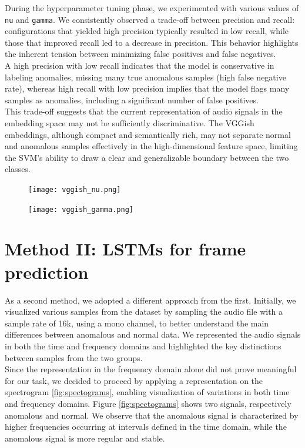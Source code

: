 \documentclass[ngerman]{scrartcl}
\begin{document}
During the hyperparameter tuning phase, we experimented with various values of \texttt{nu} and \texttt{gamma}. We consistently observed a trade-off between precision and recall: configurations that yielded high precision typically resulted in low recall, while those that improved recall led to a decrease in precision. This behavior highlights the inherent tension between minimizing false positives and false negatives.\\ 
A high precision with low recall indicates that the model is conservative in labeling anomalies, missing many true anomalous samples (high false negative rate), whereas high recall with low precision implies that the model flags many samples as anomalies, including a significant number of false positives.\\
This trade-off suggests that the current representation of audio signals in the embedding space may not be sufficiently discriminative. The VGGish embeddings, although compact and semantically rich, may not separate normal and anomalous samples effectively in the high-dimensional feature space, limiting the SVM's ability to draw a clear and generalizable boundary between the two classes.


\begin{figure}[htbp]
    \centering
    \begin{minipage}{0.48\textwidth}
        \centering
        \texttt{[image: vggish\_nu.png]}
        \label{fig:image1}
    \end{minipage}
    \hfill
    \begin{minipage}{0.48\textwidth}
        \centering
        \texttt{[image: vggish\_gamma.png]}
        \label{fig:image2}
    \end{minipage}
    \label{fig:side_by_side}
\end{figure}

\section{Method II: LSTMs for frame prediction}

As a second method, we adopted a different approach from the first. 
Initially, we visualized various samples from the dataset by sampling the audio file with a sample rate of 16k, using a mono channel, to better understand the main differences between anomalous and normal data. 
We represented the audio signals in both the time and frequency domains and highlighted the key distinctions between samples from the two groups.
\\Since the representation in the frequency domain alone did not prove meaningful for our task, we decided to proceed by applying a representation on the spectrogram \ref{fig:spectograms},
 enabling visualization of variations in both time and frequency domains. Figure \ref{fig:spectograms} shows two signals, respectively anomalous and normal. 
 We observe that the anomalous signal is characterized by higher frequencies occurring at intervals defined in the time domain, while the anomalous signal is more regular and stable.
\end{document}
